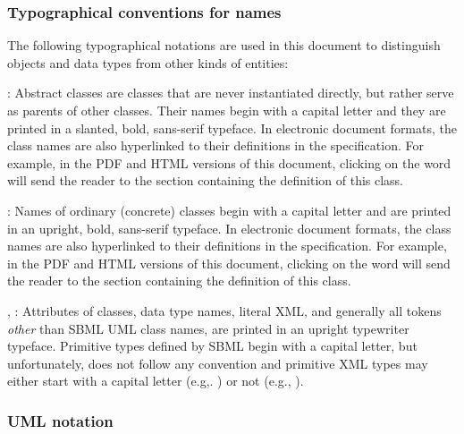 \subsubsection{Typographical conventions for names}
\label{sec:notation-typographical}

The following typographical notations are used in this document to
distinguish objects and data types from other kinds of entities:

\begin{description}
  
\item {}: Abstract classes are classes
  that are never instantiated directly, but rather serve as
  parents of other classes.  Their names begin with a capital
  letter and they are printed in a slanted, bold,
  sans-serif typeface.  In electronic document formats, the class
  names are also hyperlinked to their definitions in the
  specification.  For example, in the PDF and HTML versions of
  this document, clicking on the word \SBase will send the reader
  to the section containing the definition of this class.
  
\item {}: Names of ordinary (concrete) classes begin
  with a capital letter and are printed in an upright,
  bold, sans-serif typeface.  In electronic document
  formats, the class names are also hyperlinked to their
  definitions in the specification.  For example, in the PDF and
  HTML versions of this document, clicking on the word \Species
  will send the reader to the section containing the definition of
  this class.

\item {}, : Attributes
  of classes, data type names, literal XML, and generally all
  tokens \emph{other} than SBML UML class names, are printed in an
  upright typewriter typeface.  Primitive types defined by SBML
  begin with a capital letter, but unfortunately, \xmlschemaone
  does not follow any convention and primitive XML types may
  either start with a capital letter (e.g,.  ) or not
  (e.g., ).

\end{description}


\subsubsection{UML notation}
\label{sec:notation-uml}

